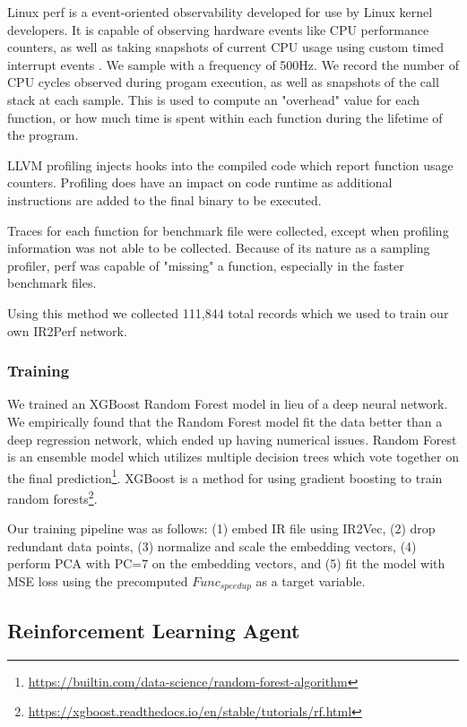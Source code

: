 \documentclass[nohyperref]{article}
\theoremstyle{plain}
\theoremstyle{definition}
\theoremstyle{remark}
\begin{document}
Linux perf is a event-oriented observability developed for use by Linux kernel developers. It is capable of observing hardware events like CPU performance counters, as well as taking snapshots of current CPU usage using custom timed interrupt events \cite{perf}. We sample with a frequency of 500Hz. We record the number of CPU cycles observed during progam execution, as well as snapshots of the call stack at each sample. This is used to compute an "overhead" value for each function, or how much time is spent within each function during the lifetime of the program.

LLVM profiling injects hooks into the compiled code which report function usage counters. Profiling does have an impact on code runtime as additional instructions are added to the final binary to be executed.

Traces for each function for benchmark file were collected, except when profiling information was not able to be collected. Because of its nature as a sampling profiler, perf was capable of "missing" a function, especially in the faster benchmark files.

Using this method we collected 111,844 total records which we used to train our own IR2Perf network.

\subsubsection{Training}
We trained an XGBoost Random Forest model in lieu of a deep neural network. We empirically found that the Random Forest model fit the data better than a deep regression network, which ended up having numerical issues. Random Forest is an ensemble model which utilizes multiple decision trees which vote together on the final prediction\footnote{\href{https://builtin.com/data-science/random-forest-algorithm}{https://builtin.com/data-science/random-forest-algorithm}}. XGBoost is a method for using gradient boosting to train random forests\footnote{\href{https://xgboost.readthedocs.io/en/stable/tutorials/rf.html}{https://xgboost.readthedocs.io/en/stable/tutorials/rf.html}}.

Our training pipeline was as follows: (1) embed IR file using IR2Vec, (2) drop redundant data points, (3) normalize and scale the embedding vectors, (4) perform PCA with PC=7 on the embedding vectors, and (5) fit the model with MSE loss using the precomputed $Func_{speedup}$ as a target variable.

\subsection{Reinforcement Learning Agent}
\end{document}
